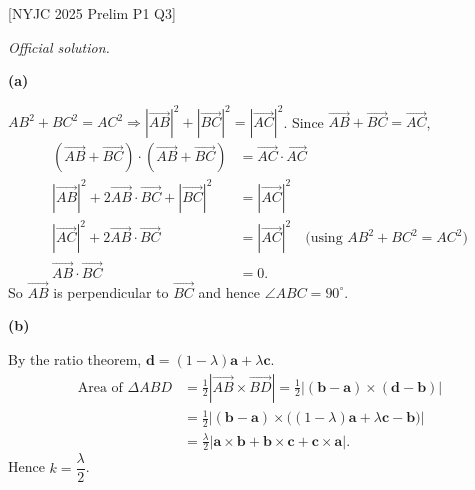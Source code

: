 \documentclass[a4paper,11pt,oneside]{book}
\providecommand{\vv}[1]{\overrightarrow{#1}}\providecommand{\cvv}[3]{\begin{pmatrix}#1\\#2\\#3\end{pmatrix}}
\newcounter{wq}
\newcommand{\Q}[1]{\par\needspace{5\baselineskip}\medskip\stepcounter{wq}\noindent\textbf{\thewq}\quad #1\par}
\begin{document}
\Q{\textcolor{black!60}{\small[NYJC 2025 Prelim P1 Q3]}\par\smallskip\textit{Official solution.}}
\par\smallskip\noindent\textbf{(a)}\par
$AB^2+BC^2=AC^2\Rightarrow|\vv{AB}|^2+|\vv{BC}|^2=|\vv{AC}|^2$.
Since $\vv{AB}+\vv{BC}=\vv{AC}$,
\begin{align*}
(\vv{AB}+\vv{BC})\cdot(\vv{AB}+\vv{BC})&=\vv{AC}\cdot\vv{AC}\\
|\vv{AB}|^2+2\vv{AB}\cdot\vv{BC}+|\vv{BC}|^2&=|\vv{AC}|^2\\
|\vv{AC}|^2+2\vv{AB}\cdot\vv{BC}&=|\vv{AC}|^2\quad\text{(using }AB^2+BC^2=AC^2\text{)}\\
\vv{AB}\cdot\vv{BC}&=0.
\end{align*}
So $\vv{AB}$ is perpendicular to $\vv{BC}$ and hence $\angle ABC=90^\circ$.
\par\smallskip\noindent\textbf{(b)}\par
By the ratio theorem, $\mathbf d=(1-\lambda)\mathbf a+\lambda\mathbf c$.
\begin{align*}
\text{Area of }\Delta ABD
&=\frac12\left|\vv{AB}\times\vv{BD}\right|
=\frac12\left|(\mathbf b-\mathbf a)\times(\mathbf d-\mathbf b)\right|\\
&=\frac12\left|(\mathbf b-\mathbf a)\times\big((1-\lambda)\mathbf a+\lambda\mathbf c-\mathbf b\big)\right|\\
&=\frac{\lambda}{2}\left|\mathbf a\times\mathbf b+\mathbf b\times\mathbf c+\mathbf c\times\mathbf a\right|.
\end{align*}
Hence $k=\dfrac{\lambda}{2}$.
\end{document}
